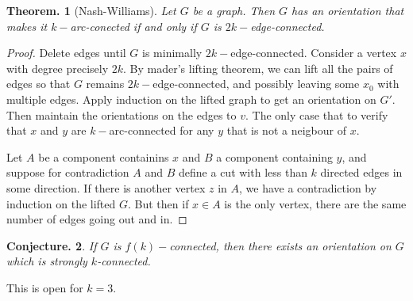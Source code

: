 \documentclass[11pt, a4paper]{memoir}
\theoremstyle{change}
\newtheorem{theorem}{Theorem.}[section]
\newtheorem{conjecture}[theorem]{Conjecture.}
\theoremstyle{plain}
\theoremstyle{nonumberplain}
\newtheorem{proof}{Proof}
\numberwithin{equation}{section}
\begin{document}
\begin{theorem}[Nash-Williams]
    Let $G$ be a graph.
    Then $G$ has an orientation that makes it $k-$arc-conected if and only if $G$ is $2k-$edge-connected.
\end{theorem}
\begin{proof}
    Delete edges until $G$ is minimally $2k-$edge-connected.
    Consider a vertex $x$ with degree precisely $2k$.
    By mader's lifting theorem, we can lift all the pairs of edges so that $G$ remains $2k-$edge-connected, and possibly leaving some $x_0$ with multiple edges.
    Apply induction on the lifted graph to get an orientation on $G'$.
    Then maintain the orientations on the edges to $v$.
    The only case that to verify that $x$ and $y$ are $k-$arc-connected for any $y$ that is not a neigbour of $x$.

    Let $A$ be a component containins $x$ and $B$ a component containing $y$, and suppose for contradiction $A$ and $B$ define a cut with less than $k$ directed edges in some direction.
    If there is another vertex $z$ in $A$, we have a contradiction by induction on the lifted $G$.
    But then if $x\in A$ is the only vertex, there are the same number of edges going out and in.
\end{proof}
\begin{conjecture}
    If $G$ is $f(k)-$connected, then there exists an orientation on $G$ which is strongly $k$-connected.
\end{conjecture}
This is open for $k=3$.
\end{document}

